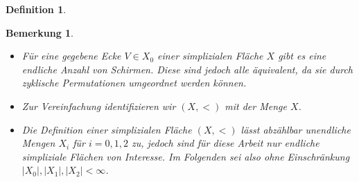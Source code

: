 \documentclass[12pt,titlepage,twoside,cleardoublepage]{article}
\theoremstyle{nummermitklammern}
\newtheorem{definition}[temp]{Definition}
\newtheorem{bemerkung}[temp]{Bemerkung}
\newtheorem{definition}[zahl]{Definition}
\newtheorem{bemerkung}[zahl]{Bemerkung}
\numberwithin{equation}{section}
\begin{document}
\begin{definition}
\begin{enumerate}
\end{enumerate}
\end{definition}

\begin{bemerkung}
\begin{itemize}
\item Für eine gegebene Ecke $V \in X_0$ einer simplizialen Fläche $X$ gibt es eine endliche Anzahl von Schirmen. Diese sind jedoch alle äquivalent, da sie durch zyklische Permutationen umgeordnet werden können.
\item Zur Vereinfachung identifizieren wir $(X,<)$ mit der Menge $X$. 
\item Die Definition einer simplizialen Fläche $(X,<)$ lässt abzählbar unendliche Mengen $X_i$ für $i=0,1,2$ zu, jedoch sind für diese Arbeit nur endliche simpliziale Flächen von Interesse. Im Folgenden sei also ohne Einschränkung $\vert X_0\vert,\vert X_1\vert,\vert X_2\vert < \infty$.
\end{itemize}
\end{bemerkung}
 
\end{document}
